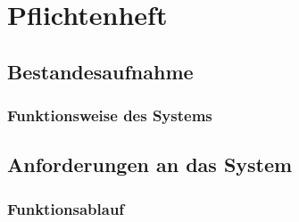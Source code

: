 \section{Pflichtenheft}
\subsection{Bestandesaufnahme}
\subsubsection{Funktionsweise des Systems}
\subsection{Anforderungen an das System}
\subsubsection{Funktionsablauf}